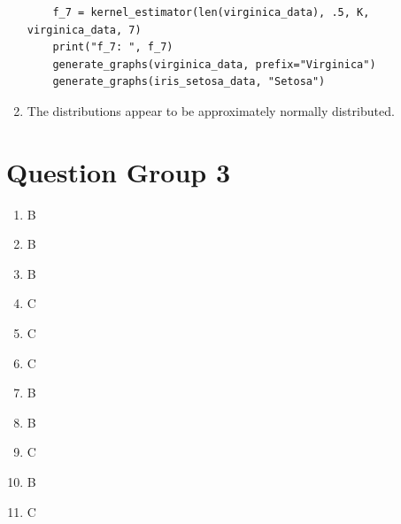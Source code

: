 \documentclass{article}
\begin{document}
\begin{enumerate}
\begin{verbatim}
    f_7 = kernel_estimator(len(virginica_data), .5, K, virginica_data, 7)
    print("f_7: ", f_7)
    generate_graphs(virginica_data, prefix="Virginica")
    generate_graphs(iris_setosa_data, "Setosa")
\end{verbatim}
\item The distributions appear to be approximately normally distributed.
\end{enumerate}
\section*{Question Group 3}
\begin{enumerate}
\item B \\
\item B \\
\item B \\
\item C \\
\item C \\
\item C \\
\item B \\
\item B \\
\item C \\
\item B \\
\item C
\end{enumerate}
\end{document}
